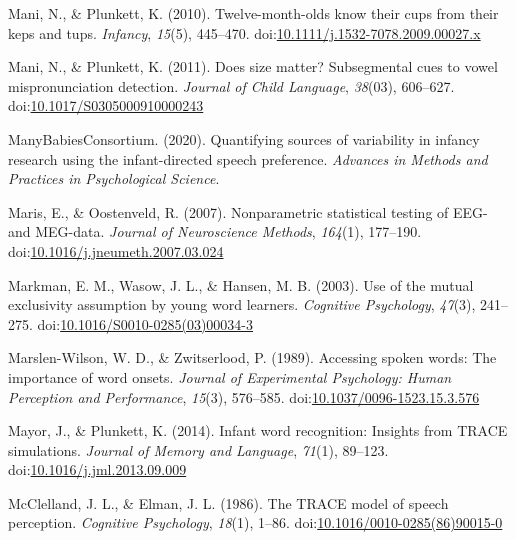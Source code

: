\documentclass[man]{apa6}
\begin{document}
\leavevmode\hypertarget{ref-Mani2010kepstups}{}%
Mani, N., \& Plunkett, K. (2010). Twelve-month-olds know their cups from their keps and tups. \emph{Infancy}, \emph{15}(5), 445--470. doi:\href{https://doi.org/10.1111/j.1532-7078.2009.00027.x}{10.1111/j.1532-7078.2009.00027.x}

\leavevmode\hypertarget{ref-Mani2011}{}%
Mani, N., \& Plunkett, K. (2011). Does size matter? Subsegmental cues to vowel mispronunciation detection. \emph{Journal of Child Language}, \emph{38}(03), 606--627. doi:\href{https://doi.org/10.1017/S0305000910000243}{10.1017/S0305000910000243}

\leavevmode\hypertarget{ref-MB1}{}%
ManyBabiesConsortium. (2020). Quantifying sources of variability in infancy research using the infant-directed speech preference. \emph{Advances in Methods and Practices in Psychological Science}.

\leavevmode\hypertarget{ref-Maris2007}{}%
Maris, E., \& Oostenveld, R. (2007). Nonparametric statistical testing of EEG- and MEG-data. \emph{Journal of Neuroscience Methods}, \emph{164}(1), 177--190. doi:\href{https://doi.org/10.1016/j.jneumeth.2007.03.024}{10.1016/j.jneumeth.2007.03.024}

\leavevmode\hypertarget{ref-Markman2003}{}%
Markman, E. M., Wasow, J. L., \& Hansen, M. B. (2003). Use of the mutual exclusivity assumption by young word learners. \emph{Cognitive Psychology}, \emph{47}(3), 241--275. doi:\href{https://doi.org/10.1016/S0010-0285(03)00034-3}{10.1016/S0010-0285(03)00034-3}

\leavevmode\hypertarget{ref-Marslen-Wilson1989}{}%
Marslen-Wilson, W. D., \& Zwitserlood, P. (1989). Accessing spoken words: The importance of word onsets. \emph{Journal of Experimental Psychology: Human Perception and Performance}, \emph{15}(3), 576--585. doi:\href{https://doi.org/10.1037/0096-1523.15.3.576}{10.1037/0096-1523.15.3.576}

\leavevmode\hypertarget{ref-Mayor2014}{}%
Mayor, J., \& Plunkett, K. (2014). Infant word recognition: Insights from TRACE simulations. \emph{Journal of Memory and Language}, \emph{71}(1), 89--123. doi:\href{https://doi.org/10.1016/j.jml.2013.09.009}{10.1016/j.jml.2013.09.009}

\leavevmode\hypertarget{ref-McClelland1986}{}%
McClelland, J. L., \& Elman, J. L. (1986). The TRACE model of speech perception. \emph{Cognitive Psychology}, \emph{18}(1), 1--86. doi:\href{https://doi.org/10.1016/0010-0285(86)90015-0}{10.1016/0010-0285(86)90015-0}
\end{document}
